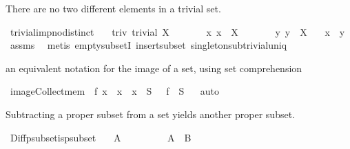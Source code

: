 \begin{isabellebody}
\begin{isamarkuptext}
There are no two different elements in a trivial set.%
\end{isamarkuptext}%
\isamarkuptrue%
\isamarkupfalse%
\ trivial{\isacharunderscore}imp{\isacharunderscore}no{\isacharunderscore}distinct{\isacharcolon}\isanewline
\ \ \ triv{\isacharcolon}\ {\isachardoublequoteopen}trivial\ X{\isachardoublequoteclose}\isanewline
\ \ \ \ \ \ \ x{\isacharcolon}\ {\isachardoublequoteopen}x\ {\isasymin}\ X{\isachardoublequoteclose}\isanewline
\ \ \ \ \ \ \ y{\isacharcolon}\ {\isachardoublequoteopen}y\ {\isasymin}\ X{\isachardoublequoteclose}\isanewline
\ \ \ {\isachardoublequoteopen}x\ {\isacharequal}\ y{\isachardoublequoteclose}\isanewline
%
\isadelimproof
\isanewline
%
\endisadelimproof
%
\isatagproof
{}\isamarkupfalse%
\ assms\ \isanewline
{}\isamarkupfalse%
\ {\isacharparenleft}metis\ empty{\isacharunderscore}subsetI\ insert{\isacharunderscore}subset\ singleton{\isacharunderscore}sub{\isacharunderscore}trivial{\isacharunderscore}uniq{\isacharparenright}%
\endisatagproof
{\isafoldproof}%
%
\isadelimproof
%
\endisadelimproof
%
\isamarkuptrue%
%
\begin{isamarkuptext}%
an equivalent notation for the image of a set, using set comprehension%
\end{isamarkuptext}%
\isamarkuptrue%
\isamarkupfalse%
\ image{\isacharunderscore}Collect{\isacharunderscore}mem{\isacharcolon}\ {\isachardoublequoteopen}{\isacharbraceleft}\ f\ x\ {\isacharbar}\ x\ {\isachardot}\ x\ {\isasymin}\ S\ {\isacharbraceright}\ {\isacharequal}\ f\ {\isacharbackquote}\ S{\isachardoublequoteclose}%
\isadelimproof
\ %
\endisadelimproof
%
\isatagproof
{}\isamarkupfalse%
\ auto%
\endisatagproof
{\isafoldproof}%
%
\isadelimproof
%
\endisadelimproof
%
\isamarkuptrue%
%
\begin{isamarkuptext}%
Subtracting a proper subset from a set yields another proper subset.%
\end{isamarkuptext}%
\isamarkuptrue%
\isamarkupfalse%
\ Diff{\isacharunderscore}psubset{\isacharunderscore}is{\isacharunderscore}psubset{\isacharcolon}\isanewline
\ \ \ {\isachardoublequoteopen}A\ {\isasymnoteq}\ {\isacharbraceleft}{\isacharbraceright}{\isachardoublequoteclose}\isanewline
\ \ \ \ \ \ \ {\isachardoublequoteopen}A\ {\isasymsubset}\ B{\isachardoublequoteclose}\isanewline

\end{isabellebody}
